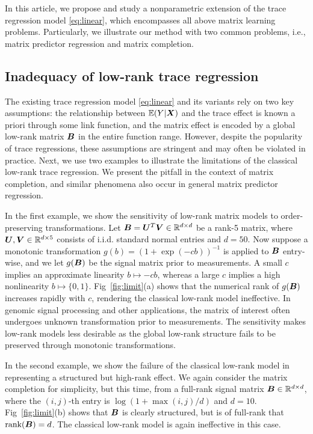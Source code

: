 \documentclass[11pt]{article}
\theoremstyle{plain}
\theoremstyle{definition}
\begin{document}
\noindent
In this article, we propose and study a nonparametric extension of the trace regression model \eqref{eq:linear}, which encompasses all above matrix learning problems. Particularly, we illustrate our method with two common problems, i.e., matrix predictor regression and matrix completion.



\subsection{Inadequacy of low-rank trace regression}
\label{sec:limit}

The existing trace regression model \eqref{eq:linear} and its variants rely on two key assumptions: the relationship between $\mathbb{E}(Y|\bm X)$ and the trace effect is known a priori through some link function, and the matrix effect is encoded by a global low-rank matrix $\bm B$ in the entire function range. However, despite the popularity of trace regressions, these assumptions are stringent and may often be violated in practice. Next, we use two examples to illustrate the limitations of the classical low-rank trace regression. We present the pitfall in the context of matrix completion, and similar phenomena also occur in general matrix predictor regression. 

In the first example, we show the sensitivity of low-rank matrix models to order-preserving transformations. Let $\bm B=\bm{U}^T\bm{V} \in \mathbb{R}^{d\times d}$ be a rank-5 matrix, where $\bm{U}, \bm{V} \in\mathbb{R}^{d\times 5}$ consists of i.i.d. standard normal entries and $d=50$. Now suppose a monotonic transformation $g(b)=(1+\exp(-cb))^{-1}$ is applied to $\bm B$ entry-wise, and we let $g(\bm B)$ be the signal matrix prior to measurements. A small $c$ implies an approximate linearity $b\mapsto -cb$, whereas a large $c$ implies a high nonlinearity $b\mapsto \{0,1\}$. Fig~\ref{fig:limit}(a) shows that the numerical rank of $g(\bm B)$ increases rapidly with $c$, rendering the classical low-rank model ineffective. In genomic signal processing and other applications, the matrix of interest often undergoes unknown transformation prior to measurements. The sensitivity makes low-rank models less desirable as the global low-rank structure fails to be preserved through monotonic transformations.

In the second example, we show the failure of the classical low-rank model in representing a structured but high-rank effect. We again consider the matrix completion for simplicity, but this time, from a full-rank signal matrix $\bm B\in\mathbb{R}^{d\times d}$, where the $(i,j)$-th entry is $\log(1+\max(i,j)/d)$ and $d=10$. Fig~\ref{fig:limit}(b) shows that $\bm B$ is clearly structured, but is of full-rank that $\text{rank}(\bm B)=d$. The classical low-rank model is again ineffective in this case. 
\end{document}
